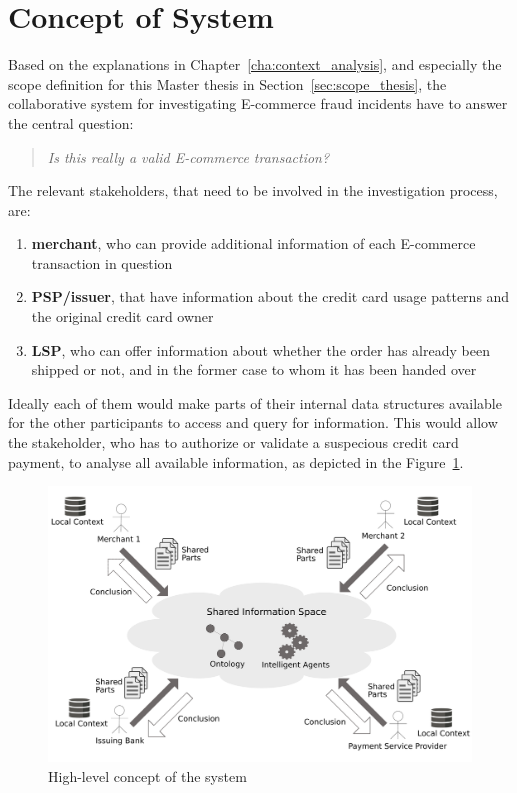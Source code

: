 
\section{Concept of System}
\label{sec:system_concept}

Based on the explanations in Chapter~\ref{cha:context_analysis}, and especially the scope definition for this Master thesis in Section~\ref{sec:scope_thesis}, the collaborative system for investigating \gls{E-commerce} fraud incidents have to answer the central question:\@

\begin{quotation}
  \textit{Is this really a valid \gls{E-commerce} transaction?}
\end{quotation}

The relevant stakeholders, that need to be involved in the investigation process, are:\@

\begin{enumerate}
    \item \textbf{merchant}, who can provide additional information of each \gls{E-commerce} transaction in question
    \item \textbf{\gls{PSP}/issuer}, that have information about the credit card usage patterns and the original credit card owner
    \item \textbf{\gls{LSP}}, who can offer information about whether the order has already been shipped or not, and in the former case to whom it has been handed over
\end{enumerate}

Ideally each of them would make parts of their internal data structures available for the other participants to access and query for information. This would allow the stakeholder, who has to authorize or validate a suspecious credit card payment, to analyse all available information, as depicted in the Figure~\ref{fig:images_system_overview}.\@

\begin{figure}[H]
	\centering
		\includegraphics[width=0.9\columnwidth]{images/system_overview.pdf}
	\caption{High-level concept of the system}
\label{fig:images_system_overview}
\end{figure}

